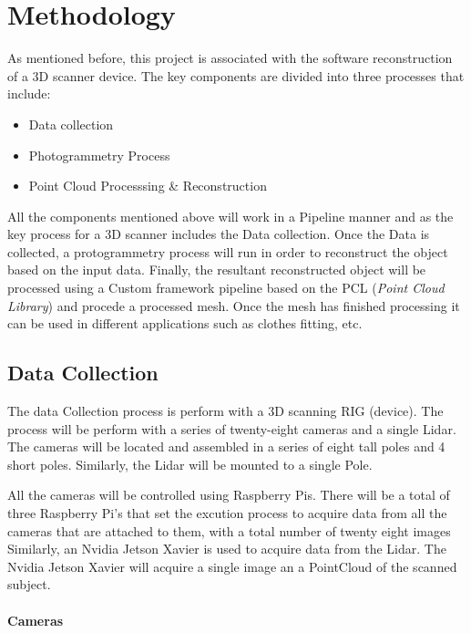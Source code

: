 \documentclass[12pt]{report}
\begin{document}
\chapter{Methodology}
As mentioned before, this project is associated with the software reconstruction of a 3D scanner device.
The key components are divided into three processes that include:

\begin{itemize}
  \item Data collection
  \item Photogrammetry Process
  \item Point Cloud Processsing \& Reconstruction
\end{itemize}

All the components mentioned above will work in a Pipeline manner and as the key process for a 3D scanner includes the Data collection. 
Once the Data is collected, a protogrammetry process will run in order to reconstruct the object based on the input data. 
Finally, the resultant reconstructed object will be processed using a Custom framework pipeline based on the PCL (\textit{Point Cloud Library}) and procede a processed mesh.
Once the mesh has finished processing it can be used in different applications such as clothes fitting, etc.

\section{Data Collection}
The data Collection process is perform with a 3D scanning RIG (device).
The process will be perform with a series of twenty-eight cameras and a single Lidar. 
The cameras will be located and assembled in a series of eight tall poles and 4 short poles. Similarly, the Lidar will be mounted to a single Pole.

All  the cameras will be controlled using Raspberry Pis.
There will be a total of three Raspberry Pi's that set the excution process to acquire data from all the cameras that are attached to them, with a total number of twenty eight images
Similarly, an Nvidia Jetson Xavier is used to acquire data from the Lidar. The Nvidia Jetson Xavier will acquire a single image an a PointCloud of the scanned subject. 

\newpage
\subsubsection*{Cameras}
\end{document}
